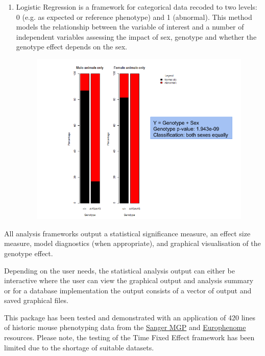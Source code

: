 \documentclass[12pt,a4paper]{article}
\begin{document}
\begin{enumerate}
\item Logistic Regression is a framework for categorical data recoded to two levels: 0 (e.g. as expected or reference phenotype) and 1 (abnormal). This method models the relationship between the variable of interest and a number of independent variables assessing the impact of sex, genotype and whether the genotype effect depends on the sex.
\begin{figure}[H]%
\centerline{\includegraphics[scale=0.5]{LR_simple.png}}
\end{figure}

\end{enumerate}

All analysis frameworks output a statistical significance measure, an effect size measure, model diagnostics (when appropriate), and graphical visualisation of the genotype effect. 

Depending on the user needs, the statistical analysis output can either be interactive where the user can view the graphical output and analysis summary or for a database implementation the output consists of a vector of output and saved graphical files. 

This package has been tested and demonstrated with an application of 420 lines of historic mouse phenotyping data from the  \href{http://www.sanger.ac.uk/mouseportal/}{Sanger MGP} and \href{http://www.europhenome.org/}{Europhenome} resources. Please note, the testing of the Time Fixed Effect framework has been limited due to the shortage of suitable datasets.
\\
\end{document}
